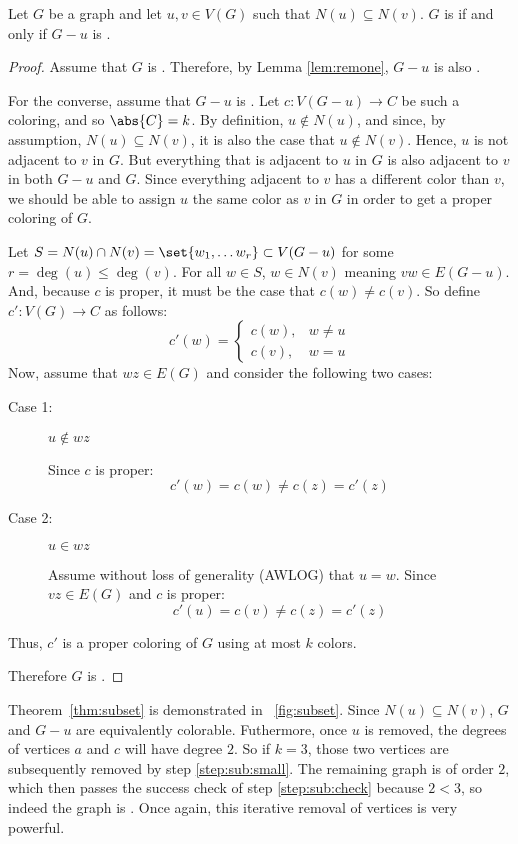 \begin{theorem}
  \label{thm:subset}
  Let \(G\) be a graph and let \(u,v\in V(G)\) such that \(N(u)\subseteq N(v)\).  \(G\) is  if and
  only if \(G-u\) is .
\end{theorem}

\begin{proof}
  Assume that \(G\) is .  Therefore, by Lemma \ref{lem:remone}, \(G-u\) is also .

  For the converse, assume that \(G-u\) is .  Let \(c:V(G-u)\to C\) be such a coloring, and so
  \(\abs{C}=k\).  By definition, \(u\notin N(u)\), and since, by assumption, \(N(u)\subseteq N(v)\), it is also the
  case that \(u\notin N(v)\).  Hence, \(u\) is not adjacent to \(v\) in \(G\).  But everything that is adjacent to
  \(u\) in \(G\) is also adjacent to \(v\) in both \(G-u\) and \(G\).  Since everything adjacent to \(v\) has a
  different color than \(v\), we should be able to assign \(u\) the same color as \(v\) in \(G\) in order to get a
  proper coloring of \(G\).

  Let \(S=N(u)\cap N(v)=\set{w_1,\ldots w_r}\subset V(G-u)\) for some \(r=\deg(u)\le \deg(v)\).  For all \(w\in
  S\), \(w\in N(v)\) meaning \(vw\in E(G-u)\).  And, because \(c\) is proper, it must be the case that \(c(w)\ne
  c(v)\).  So define \(c':V(G)\to C\) as follows:
  \[c'(w)=\begin{cases}
  c(w), & w\ne u \\
  c(v), & w=u
  \end{cases}\]
  Now, assume that \(wz\in E(G)\) and consider the following two cases:
  \begin{description}
  \item[Case 1:] \(u\notin wz\)

    Since \(c\) is proper:
    \[c'(w)=c(w)\ne c(z)=c'(z)\]
  \item[Case 2:] \(u\in wz\)

    Assume without loss of generality (AWLOG) that \(u=w\).  Since \(vz\in E(G)\) and \(c\) is proper:
    \[c'(u)=c(v)\ne c(z)=c'(z)\]
  \end{description}
  Thus, \(c'\) is a proper coloring of \(G\) using at most \(k\) colors.

  Therefore \(G\) is .
\end{proof}

Theorem~\ref{thm:subset} is demonstrated in \figurename~\ref{fig:subset}.  Since \(N(u)\subseteq N(v)\), \(G\) and
\(G-u\) are equivalently colorable.  Futhermore, once \(u\) is removed, the degrees of vertices \(a\) and \(c\)
will have degree \(2\).  So if \(k=3\), those two vertices are subsequently removed by step \ref{step:sub:small}.
The remaining graph is of order \(2\), which then passes the success check of step \ref{step:sub:check} because
\(2<3\), so indeed the graph is .  Once again, this iterative removal of vertices is very powerful.

